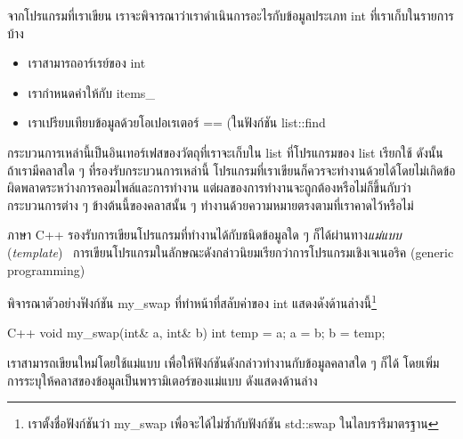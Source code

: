 จาก{\wbr}โปรแกรม{\wbr}ที่{\wbr}เรา{\wbr}เขียน เรา{\wbr}จะ{\wbr}พิจารณา{\wbr}ว่า{\wbr}เรา{\wbr}ดำเนินการ{\wbr}อะไร{\wbr}กับ{\wbr}ข้อมูล{\wbr}ประเภท {\ct int}
ที่{\wbr}เรา{\wbr}เก็บ{\wbr}ใน{\wbr}รายการ{\wbr}บ้าง{\wbr}
\begin{itemize}
\item เรา{\wbr}สามารถ{\wbr}อาร์เรย์{\wbr}ของ {\ct int}
\item เรา{\wbr}กำหนด{\wbr}ค่า{\wbr}ให้{\wbr}กับ {\ct items\_}
\item เรา{\wbr}เปรียบเทียบ{\wbr}ข้อมูล{\wbr}ด้วย{\wbr}โอ{\wbr}เปอเรเตอร์ {\ct ==} (ใน{\wbr}ฟังก์ชัน {\ct list::find}
\end{itemize}
กระบวนการ{\wbr}เหล่านี้{\wbr}เป็น{\wbr}อิน{\wbr}เทอร์เฟส{\wbr}ของ{\wbr}วัตถุ{\wbr}ที่{\wbr}เรา{\wbr}จะ{\wbr}เก็บ{\wbr}ใน {\ct list} ที่{\wbr}โปรแกรม{\wbr}ของ{\wbr}
{\ct list} เรียก{\wbr}ใช้ ดังนั้น ถ้า{\wbr}เรา{\wbr}มี{\wbr}ค{\wbr}ลา{\wbr}ส{\wbr}ใด ๆ ที่{\wbr}รองรับ{\wbr}กระบวนการ{\wbr}เหล่านี้{\wbr}
โปรแกรม{\wbr}ที่{\wbr}เรา{\wbr}เขียน{\wbr}ก็{\wbr}ควร{\wbr}จะ{\wbr}ทำงาน{\wbr}ด้วย{\wbr}ได้{\wbr}โดย{\wbr}ไม่{\wbr}เกิด{\wbr}ข้อผิดพลาด{\wbr}ระหว่าง{\wbr}การ{\wbr}คอมไพล์{\wbr}และ{\wbr}การ{\wbr}ทำงาน{\wbr}
แต่{\wbr}ผล{\wbr}ของ{\wbr}การ{\wbr}ทำงาน{\wbr}จะ{\wbr}ถูกต้อง{\wbr}หรือ{\wbr}ไม่{\wbr}ก็{\wbr}ขึ้น{\wbr}กับ{\wbr}ว่า{\wbr}กระบวนการ{\wbr}ต่าง ๆ ข้างต้น{\wbr}นี้{\wbr}ของ{\wbr}ค{\wbr}ลา{\wbr}ส{\wbr}นั้น ๆ
ทำงาน{\wbr}ด้วย{\wbr}ความหมาย{\wbr}ตรง{\wbr}ตาม{\wbr}ที่{\wbr}เรา{\wbr}คาด{\wbr}ไว้{\wbr}หรือ{\wbr}ไม่{\wbr}

ภาษา C++ รองรับ{\wbr}การ{\wbr}เขียน{\wbr}โปรแกรม{\wbr}ที่ทำงาน{\wbr}ได้{\wbr}กับ{\wbr}ชนิด{\wbr}ข้อมูล{\wbr}ใด ๆ ก็ได้{\wbr}ผ่าน{\wbr}ทาง{\em แม่แบบ}
({\em template})
\ การ{\wbr}เขียน{\wbr}โปรแกรม{\wbr}ใน{\wbr}ลักษณะ{\wbr}ดังกล่าว{\wbr}นิยม{\wbr}เรียก{\wbr}ว่า{\wbr}การ{\wbr}โปรแกรม{\wbr}เชิง{\wbr}เจ{\wbr}เน{\wbr}อริ{\wbr}ค (generic
programming)

พิจารณา{\wbr}ตัวอย่าง{\wbr}ฟังก์ชัน {\ct my\_swap} ที่{\wbr}ทำ{\wbr}หน้าที่{\wbr}สลับ{\wbr}ค่า{\wbr}ของ {\ct
  int} แสดง{\wbr}ดัง{\wbr}ด้าน{\wbr}ล่าง{\wbr}นี้\footnote{เรา{\wbr}ตั้ง{\wbr}ชื่อ{\wbr}ฟังก์ชัน{\wbr}ว่า {\ct my\_swap}
  เพื่อ{\wbr}จะ{\wbr}ได้{\wbr}ไม่{\wbr}ซ้ำ{\wbr}กับ{\wbr}ฟังก์ชัน {\ct std::swap} ใน{\wbr}ไลบ{\wbr}รา{\wbr}รี{\wbr}มาตรฐาน}

\latintext
\begin{codelist}{C++}{}
void my_swap(int& a, int& b)
{
  int temp = a;  a = b;  b = temp;
}
\end{codelist}
\thaitext

เรา{\wbr}สามารถ{\wbr}เขียน{\wbr}ใหม่{\wbr}โดย{\wbr}ใช้{\wbr}แม่แบบ เพื่อให้{\wbr}ฟังก์ชัน{\wbr}ดังกล่าว{\wbr}ทำงาน{\wbr}กับ{\wbr}ข้อมูล{\wbr}ค{\wbr}ลา{\wbr}ส{\wbr}ใด ๆ ก็ได้{\wbr}
โดย{\wbr}เพิ่ม{\wbr}การ{\wbr}ระบุ{\wbr}ให้{\wbr}ค{\wbr}ลา{\wbr}ส{\wbr}ของ{\wbr}ข้อมูล{\wbr}เป็น{\wbr}พารามิเตอร์{\wbr}ของ{\wbr}แม่แบบ ดัง{\wbr}แสดง{\wbr}ด้าน{\wbr}ล่าง{\wbr}

